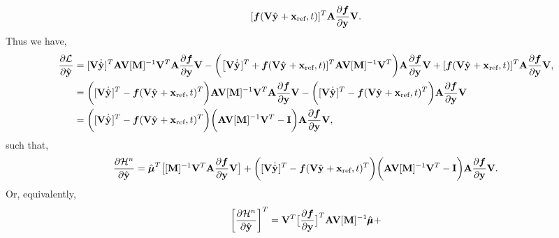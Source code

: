 \documentclass[3p,computermodern,10pt]{elsarticle}
\begin{document}
\begin{appendices}
$$  [\velocity(\veloargsromy) ]^T  \stweightingMatArg{n} \frac{\partial \velocity}{\partial \stateyDiscrete} \basisspace.
$$
Thus we have,
\begin{align*}
\frac{\partial \objectiveControlArg{}}{\partial \genstateyDiscreteArgnt{}} &= 
[\basisspace \genstateyDiscreteDotArgnt{} ]^T   \stweightingMatArg{n}   \basisspace  [\massArgnt{n}]^{-1}\basisspace^T
\stweightingMatArg{n} \frac{\partial \velocity}{\partial \stateyDiscrete} \basisspace -
\bigg( \big[ \basisspace \genstateyDiscreteDotArgnt{} ]^T  + \velocity(\veloargsromy)]^T  \stweightingMatArg{n} \basisspace [\massArgnt{n}]^{-1} \basisspace^T  \bigg) \stweightingMatArg{n} \frac{\partial \velocity}{\partial \stateyDiscrete} \basisspace + 
 [\velocity(\veloargsromy) ]^T  \stweightingMatArg{n} \frac{\partial \velocity}{\partial \stateyDiscrete} \basisspace, \\
&= 
\bigg( [\basisspace \genstateyDiscreteDotArgnt{} ]^T - \velocity(\veloargsromy)^T \bigg)  \stweightingMatArg{n}   \basisspace  [\massArgnt{n}]^{-1}\basisspace^T
\stweightingMatArg{n} \frac{\partial \velocity}{\partial \stateyDiscrete} \basisspace -
\bigg( [\basisspace \genstateyDiscreteDotArgnt{} ]^T - \velocity(\veloargsromy)^T \bigg)  \stweightingMatArg{n}
\frac{\partial \velocity}{\partial \stateyDiscrete} \basisspace \\ 
&= 
\bigg( [\basisspace \genstateyDiscreteDotArgnt{} ]^T - \velocity(\veloargsromy)^T \bigg)   \bigg( \stweightingMatArg{n} \basisspace  [\massArgnt{n}]^{-1}\basisspace^T - \mathbf{I} \bigg)
\stweightingMatArg{n} \frac{\partial \velocity}{\partial \stateyDiscrete} \basisspace, 
\end{align*}
such that,
\begin{equation*}
\frac{\partial \hamiltonianArg{n}}{\partial \genstateyDiscreteArgnt{}{}} = 
  \adjointDumArgnt{T} \big[  [\massArgnt{n}]^{-1}\basisspace^T \stweightingMatArg{n}  \frac{\partial \velocity}{\partial \stateyDiscrete}\basisspace  \big]  + 
\bigg( [\basisspace \genstateyDiscreteDotArgnt{} ]^T - \velocity(\veloargsromy)^T \bigg)   \bigg( \stweightingMatArg{n} \basisspace  [\massArgnt{n}]^{-1}\basisspace^T - \mathbf{I} \bigg)
\stweightingMatArg{n} \frac{\partial \velocity}{\partial \stateyDiscrete} \basisspace.
\end{equation*}
Or, equivalently,
\begin{equation*}
\bigg[ \frac{\partial \hamiltonianArg{n}}{\partial \genstateyDiscreteArgnt{}{}} \bigg]^T =  \basisspace^T \big[  \frac{\partial \velocity}{\partial \stateyDiscrete} \big]^T \stweightingMatArg{n}  \basisspace [\massArgnt{n}]^{-1}  \adjointDiscreteDumArgnt{} + 

\end{equation*}
\end{appendices}
\end{document}
